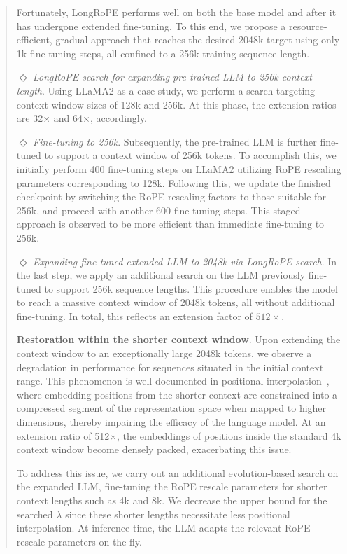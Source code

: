 \begin{abstract}
Fortunately, LongRoPE performs well on both the base model and after it has undergone extended fine-tuning. To this end, we propose a resource-efficient, gradual approach that reaches the desired 2048k target using only 1k fine-tuning steps, all confined to a 256k training sequence length.

$\Diamond$ \textit{LongRoPE search for expanding pre-trained LLM to 256k context length}. Using LLaMA2 as a case study, we perform a search targeting context window sizes of 128k and 256k. At this phase, the extension ratios are 32$\times$ and 64$\times$, accordingly.

$\Diamond$ \textit{Fine-tuning to 256k}. Subsequently, the pre-trained LLM is further fine-tuned to support a context window of 256k tokens. To accomplish this, we initially perform 400 fine-tuning steps on LLaMA2 utilizing RoPE rescaling parameters corresponding to 128k. Following this, we update the finished checkpoint by switching the RoPE rescaling factors to those suitable for 256k, and proceed with another 600 fine-tuning steps. This staged approach is observed to be more efficient than immediate fine-tuning to 256k.

$\Diamond$ \textit{Expanding fine-tuned extended LLM to 2048k via LongRoPE search}. In the last step, we apply an additional search on the LLM previously fine-tuned to support 256k sequence lengths. This procedure enables the model to reach a massive context window of 2048k tokens, all without additional fine-tuning. In total, this reflects an extension factor of $512\times$.

\textbf{Restoration within the shorter context window}. Upon extending the context window to an exceptionally large 2048k tokens, we observe a degradation in performance for sequences situated in the initial context range. This phenomenon is well-documented in positional interpolation~\cite{pi}, where embedding positions from the shorter context are constrained into a compressed segment of the representation space when mapped to higher dimensions, thereby impairing the efficacy of the language model. At an extension ratio of 512$\times$, the embeddings of positions inside the standard 4k context window become densely packed, exacerbating this issue.

To address this issue, we carry out an additional evolution-based search on the expanded LLM, fine-tuning the RoPE rescale parameters for shorter context lengths such as 4k and 8k. We decrease the upper bound for the searched $\lambda$ since these shorter lengths necessitate less positional interpolation. At inference time, the LLM adapts the relevant RoPE rescale parameters on-the-fly.


\end{abstract}
